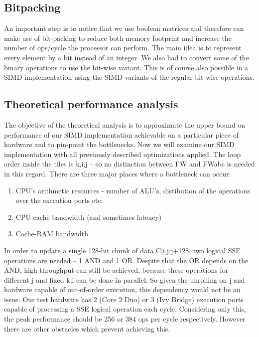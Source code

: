 \documentclass[letterpaper]{article}
\newcommand{\erik}[1]{\textcolor{blue}{[Erik: #1]}}
\begin{document}
\subsection{Bitpacking}
An important step is to notice that we use boolean matrices and therefore can make use of bit-packing to reduce both memory footprint and increase the number of ops/cycle the processor can perform. The main idea is to represent every element by a bit instead of an integer. We also had to convert some of the binary operations to use the bit-wise variant. This is of course also possible in a SIMD implementation using the SIMD variants of the regular bit-wise operations.

\subsection{Theoretical performance analysis}
The objective of the theoretical analysis is to approximate the upper bound on performance of our SIMD implementation
achievable on a particular piece of hardware and to pin-point the bottlenecks. Now we will examine our 
SIMD implementation with all previously described optimizations applied. 
The loop order inside the tiles is k,i,j -- so no distinction between FW and FWabc is needed in this regard. 
There are three major places where a bottleneck can occur:
\begin{enumerate}
\item CPU's arithmetic resources - number of ALU's, distibution of the operations over the execution ports etc. 
\item CPU-cache bandwidth (and sometimes latency)
\item Cache-RAM bandwidth
\end{enumerate}

In order to update a single 128-bit chunk of data C[i,j:j+128] two logical SSE operations are needed -- 1 AND and 1 OR. Despite that the OR depends on the AND, 
high throughput can still be achieved, because these operations for different j and fixed k,i can be done in parallel. So given the unrolling on j and hardware capable of
out-of-order execution, this dependency would not be an issue. Our test hardware has 2 (Core 2 Duo) or 3 (Ivy Bridge) execution ports capable of processing a SSE logical operation 
each cycle. Considering only this, the peak performance should be 256 or 384 ops per cycle respectively. However there are other obstacles which prevent achieving this. 
\end{document}
